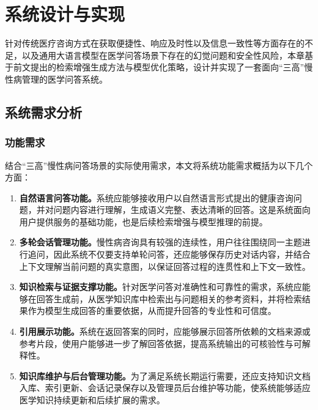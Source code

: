 \chapter{系统设计与实现}

针对传统医疗咨询方式在获取便捷性、响应及时性以及信息一致性等方面存在的不足，以及通用大语言模型在医学问答场景下存在的幻觉问题和安全性风险，本章基于前文提出的检索增强生成方法与模型优化策略，设计并实现了一套面向“三高”慢性病管理的医学问答系统。

\section{系统需求分析}


\subsection{功能需求}

结合“三高”慢性病问答场景的实际使用需求，本文将系统功能需求概括为以下几个方面：
\begin{enumerate}[label =(\arabic*)]
    \item \textbf{自然语言问答功能。}系统应能够接收用户以自然语言形式提出的健康咨询问题，并对问题内容进行理解，生成语义完整、表达清晰的回答。这是系统面向用户提供服务的基础功能，也是后续检索增强与模型推理的前提。
    \item \textbf{多轮会话管理功能。}慢性病咨询具有较强的连续性，用户往往围绕同一主题进行追问，因此系统不仅要支持单轮问答，还应能够保存历史对话内容，并结合上下文理解当前问题的真实意图，以保证回答过程的连贯性和上下文一致性。
    \item \textbf{知识检索与证据支撑功能。}针对医学问答对准确性和可靠性的需求，系统应能够在回答生成前，从医学知识库中检索出与问题相关的参考资料，并将检索结果作为模型生成回答的重要依据，从而提升回答的专业性和可信度。
    \item \textbf{引用展示功能。}系统在返回答案的同时，应能够展示回答所依赖的文档来源或参考片段，使用户能够进一步了解回答依据，提高系统输出的可核验性与可解释性。
    \item \textbf{知识库维护与后台管理功能。}为了满足系统长期运行需要，还应支持知识文档入库、索引更新、会话记录保存以及管理员后台维护等功能，使系统能够适应医学知识持续更新和后续扩展的需求。
\end{enumerate}

